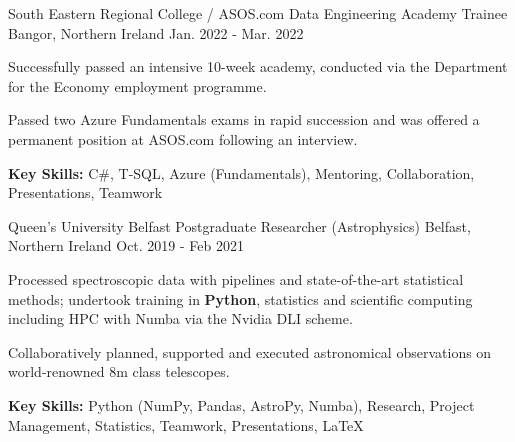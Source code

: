 \begin{cventries}
  \cventry
  	{South Eastern Regional College / ASOS.com} %
    {Data Engineering Academy Trainee} %
    {Bangor, Northern Ireland} %
    {Jan. 2022 - Mar. 2022} %
    {
      \begin{cvitems} %
        \item {Successfully passed an intensive 10-week academy, conducted via the Department for the Economy employment programme.}
        \item {Passed two Azure Fundamentals exams in rapid succession and was offered a permanent position at ASOS.com following an interview.}
        \item {\textbf{Key Skills:} C\#, T-SQL, Azure (Fundamentals), Mentoring, Collaboration, Presentations, Teamwork}
      \end{cvitems}
    }

  \cventry
    {Queen's University Belfast} %
    {Postgraduate Researcher (Astrophysics)} %
    {Belfast, Northern Ireland} %
    {Oct. 2019 - Feb 2021} %
    {
      \begin{cvitems} %
        \item {Processed spectroscopic data with pipelines and state-of-the-art statistical methods; undertook training in \textbf{Python}, statistics and scientific computing including HPC with Numba via the Nvidia DLI scheme.}
        \item {Collaboratively planned, supported and executed astronomical observations on world-renowned 8m class telescopes.}
        \item {\textbf{Key Skills:} Python (NumPy, Pandas, AstroPy, Numba), Research, Project Management, Statistics, Teamwork, Presentations, \LaTeX}
      \end{cvitems}
    }
    

\end{cventries}

